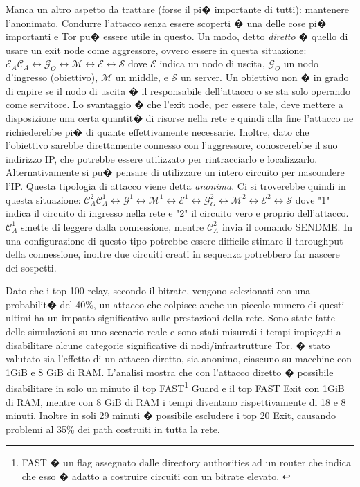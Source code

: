 Manca un altro aspetto da trattare (forse il pi� importante di tutti): mantenere l'anonimato. Condurre l'attacco senza essere scoperti � una delle cose pi� importanti e Tor pu� essere utile in questo. Un modo, detto \emph{diretto} � quello di usare un exit node come aggressore, ovvero essere in questa situazione: $\mathcal{E}_A \mathcal{C}_A \leftrightarrow \mathcal{G}_O \leftrightarrow \mathcal{M} \leftrightarrow \mathcal{E} \leftrightarrow \mathcal{S}$ dove $\mathcal{E}$ indica un nodo di uscita, $\mathcal{G}_O $ un nodo d'ingresso (obiettivo), $\mathcal{M}$ un middle, e $\mathcal{S}$ un server. Un obiettivo non � in grado di capire se il nodo di uscita � il responsabile dell'attacco o se sta solo operando come servitore.
Lo svantaggio � che l'exit node, per essere tale, deve mettere a disposizione una certa quantit� di risorse nella rete e quindi alla fine l'attacco ne richiederebbe pi� di quante effettivamente necessarie. Inoltre, dato che l'obiettivo sarebbe direttamente connesso con l'aggressore, conoscerebbe il suo indirizzo IP, che potrebbe essere utilizzato per rintracciarlo e localizzarlo. Alternativamente si pu� pensare di utilizzare un intero circuito per nascondere l'IP. Questa tipologia di attacco viene detta \emph{anonima}. Ci si troverebbe quindi in questa situazione: $\mathcal{C}_A^2 \mathcal{C}_A^1 \leftrightarrow \mathcal{G} ^1\leftrightarrow \mathcal{M}^1 \leftrightarrow \mathcal{E}^1 \leftrightarrow \mathcal{G}_{O}^2 \leftrightarrow \mathcal{M}^2 \leftrightarrow \mathcal{E}^2 \leftrightarrow \mathcal{S}$ dove "1" indica il circuito di ingresso nella rete e "2" il circuito vero e proprio dell'attacco. $\mathcal{C}_A^1$ smette di leggere dalla connessione, mentre $\mathcal{C}_A^2$ invia il comando {\ttfamily SENDME}. In una configurazione di questo tipo potrebbe essere difficile stimare il throughput della connessione, inoltre due circuiti creati in sequenza potrebbero far nascere dei sospetti.

Dato che i top 100 relay, secondo il bitrate, vengono selezionati con una probabilit� del 40\%, un attacco che colpisce anche un piccolo numero di questi ultimi ha un impatto significativo sulle prestazioni della rete. Sono state fatte delle simulazioni \cite{sniper} su uno scenario reale e sono stati misurati i tempi impiegati a disabilitare alcune categorie significative di nodi/infrastrutture Tor. � stato valutato sia l'effetto di un attacco diretto, sia anonimo, ciascuno su macchine con 1GiB e 8 GiB di RAM. L'analisi mostra che con l'attacco diretto � possibile disabilitare in solo un minuto il top {\ttfamily FAST}\footnote{{\ttfamily FAST} � un flag assegnato dalle directory authorities ad un router che indica che esso � adatto a costruire circuiti con un bitrate elevato. \cite{torspec}} Guard e il top {\ttfamily FAST} Exit con 1GiB di RAM, mentre con 8 GiB di RAM i tempi diventano rispettivamente di 18 e 8 minuti. Inoltre in soli 29 minuti � possibile escludere i top 20 Exit, causando problemi al 35\% dei path costruiti in tutta la rete.

